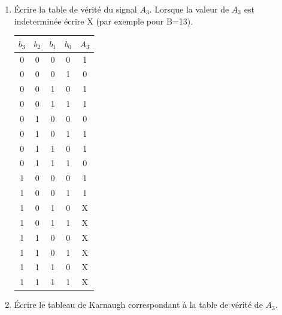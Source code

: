 \documentclass[a4paper,10pt]{exam}
\begin{document}
\begin{enumerate}
  \item Écrire la table de vérité du signal $A_3$.
    Lorsque la valeur de $A_3$ est indeterminée écrire X (par exemple pour B=13).
    \begin{solution}
      \begin{tabular}{cccc|c}
        $b_3$& $b_2$& $b_1$& $b_0$& $A_3$\\
        \hline
        0&0&0&0&1\\ %
        0&0&0&1&0\\
        0&0&1&0&1\\ %
        0&0&1&1&1\\ %
        0&1&0&0&0\\
        0&1&0&1&1\\ %
        0&1&1&0&1\\ %
        0&1&1&1&0\\
        1&0&0&0&1\\ %
        1&0&0&1&1\\ %
        1&0&1&0&X\\
        1&0&1&1&X\\
        1&1&0&0&X\\
        1&1&0&1&X\\
        1&1&1&0&X\\
        1&1&1&1&X\\
      \end{tabular}
    \end{solution}
  \item Écrire le tableau de Karnaugh correspondant à la table de vérité de
    $A_3$.
    \begin{solution}
  \begin{center}
\end{center}
\end{solution}
\end{enumerate}
\end{document}

